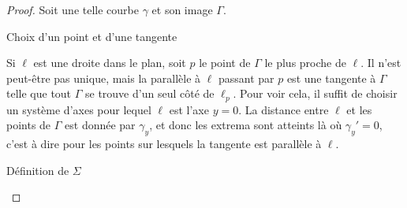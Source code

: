 \begin{proof}
    Soit une telle courbe \( \gamma\) et son image \( \Gamma\). 
    \begin{subproof}
        \item[Choix d'un point et d'une tangente]
            
            Si \( \ell\) est une droite dans le plan, soit \( p\) le point de \( \Gamma\) le plus proche de \( \ell\). Il n'est peut-être pas unique, mais la parallèle à \( \ell\) passant par \( p\) est une tangente à \( \Gamma\) telle que tout \( \Gamma\) se trouve d'un seul côté de \( \ell_p\). Pour voir cela, il suffit de choisir un système d'axes pour lequel \( \ell\) est l'axe \( y=0\). La distance entre \( \ell\) et les points de \( \Gamma\) est donnée par \( \gamma_y\), et donc les extrema sont atteints là où \( \gamma_y'=0\), c'est à dire pour les points sur lesquels la tangente est parallèle à \( \ell\).

        \item[Définition de \( \Sigma\)]


\end{subproof}
\end{proof}
